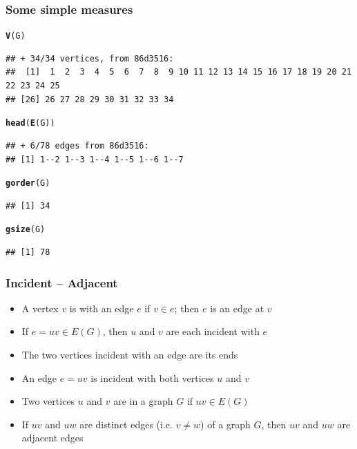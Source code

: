 \documentclass[aspectratio=169]{beamer}\usepackage[]{graphicx}\usepackage[]{xcolor}
\makeatletter
\newcommand{\hldef}[1]{\textcolor[rgb]{0.345,0.345,0.345}{#1}}%
\newcommand{\hlkwd}[1]{\textcolor[rgb]{0.737,0.353,0.396}{\textbf{#1}}}%
\newenvironment{kframe}{%
 \def\at@end@of@kframe{}%
 \ifinner\ifhmode%
  \def\at@end@of@kframe{\end{minipage}}%
  \begin{minipage}{\columnwidth}%
 \fi\fi%
 \def\FrameCommand##1{\hskip\@totalleftmargin \hskip-\fboxsep
 \colorbox{shadecolor}{##1}\hskip-\fboxsep
     \hskip-\linewidth \hskip-\@totalleftmargin \hskip\columnwidth}%
 \MakeFramed {\advance\hsize-\width
   \@totalleftmargin\z@ \linewidth\hsize
   \@setminipage}}%
 {\par\unskip\endMakeFramed%
 \at@end@of@kframe}
\newenvironment{knitrout}{}{} %
\makeatother
\begin{document}
\begin{frame}[fragile]\frametitle{Some simple measures}
\begin{knitrout}
\color{fgcolor}\begin{kframe}
\begin{alltt}
\hlkwd{V}\hldef{(G)}
\end{alltt}
\begin{verbatim}
## + 34/34 vertices, from 86d3516:
##  [1]  1  2  3  4  5  6  7  8  9 10 11 12 13 14 15 16 17 18 19 20 21 22 23 24 25
## [26] 26 27 28 29 30 31 32 33 34
\end{verbatim}
\begin{alltt}
\hlkwd{head}\hldef{(}\hlkwd{E}\hldef{(G))}
\end{alltt}
\begin{verbatim}
## + 6/78 edges from 86d3516:
## [1] 1--2 1--3 1--4 1--5 1--6 1--7
\end{verbatim}
\begin{alltt}
\hlkwd{gorder}\hldef{(G)}
\end{alltt}
\begin{verbatim}
## [1] 34
\end{verbatim}
\begin{alltt}
\hlkwd{gsize}\hldef{(G)}
\end{alltt}
\begin{verbatim}
## [1] 78
\end{verbatim}
\end{kframe}
\end{knitrout}
\end{frame}

\begin{frame}\frametitle{Incident -- Adjacent}
	\begin{definition}[Incident]
	\begin{itemize}
	\item A vertex $v$ is  with an edge $e$ if $v\in e$; then $e$ is an edge at $v$
	\item If $e=uv\in E(G)$, then $u$ and $v$ are each incident with $e$
	\item The two vertices incident with an edge are its ends
	\item An edge $e=uv$ is incident with both vertices $u$ and $v$
	\end{itemize}
	\end{definition}
	\vfill
	\begin{definition}[Adjacent]
	\begin{itemize}
	\item Two vertices $u$ and $v$ are  in a graph $G$ if $uv\in E(G)$
	\item If $uv$ and $uw$ are distinct edges (i.e. $v\not=w$) of a graph $G$, then $uv$ and $uw$ are adjacent edges
	\end{itemize}
	\end{definition}
\end{frame}
\end{document}
